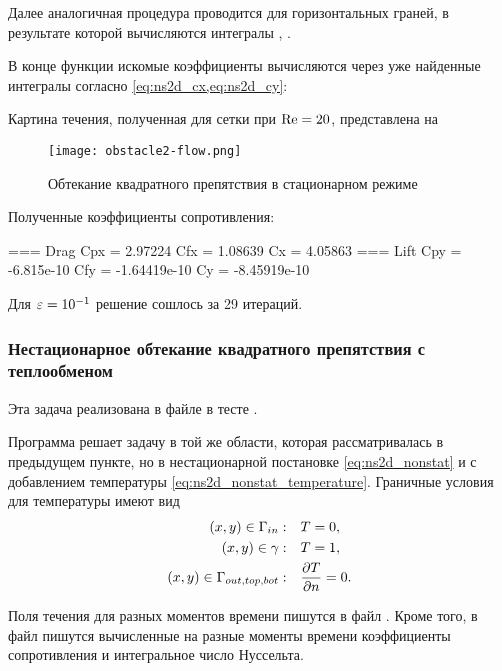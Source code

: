 Далее аналогичная процедура проводится для горизонтальных граней,
в результате которой вычисляются интегралы , .


В конце функции искомые коэффициенты вычисляются через
уже найденные интегралы согласно
\cref{eq:ns2d_cx,eq:ns2d_cy}:

Картина течения, полученная для
сетки  при $\mathrm{Re} = 20$,
представлена на 
\begin{figure}[h!]
\centering
\texttt{[image: obstacle2-flow.png]}
\caption{Обтекание квадратного препятствия в стационарном режиме}
\label{fig:obstacle2-flow}
\end{figure}
Полученные коэффициенты сопротивления:
\begin{shelloutput}
=== Drag
Cpx = 2.97224
Cfx = 1.08639
Cx  = 4.05863
=== Lift
Cpy = -6.815e-10
Cfy = -1.64419e-10
Cy  = -8.45919e-10
\end{shelloutput}
Для $\varepsilon = 10^{-1}$ решение сошлось за 29 итераций.

\subsubsection{Нестационарное обтекание квадратного препятствия с теплообменом}
\label{sec:prob-obstacle-temp}

Эта задача реализована в файле 
в тесте .

Программа решает задачу в той же области, которая рассматривалась
в предыдущем пункте, но в нестационарной постановке
\cref{eq:ns2d_nonstat}
и с добавлением температуры
\cref{eq:ns2d_nonstat_temperature}.
Граничные условия для температуры имеют вид
\begin{align*}
(x,y)\in\Gamma_{in}:          \quad& T = 0, \\
(x,y)\in\gamma:               \quad& T = 1, \\
(x,y)\in\Gamma_{out,top,bot}: \quad& \frac{\partial T}{\partial n} = 0.
\end{align*}

Поля течения для разных моментов времени пишутся в файл
. Кроме того, в файл 
пишутся вычисленные на разные моменты времени коэффициенты сопротивления и
интегральное число Нуссельта.

